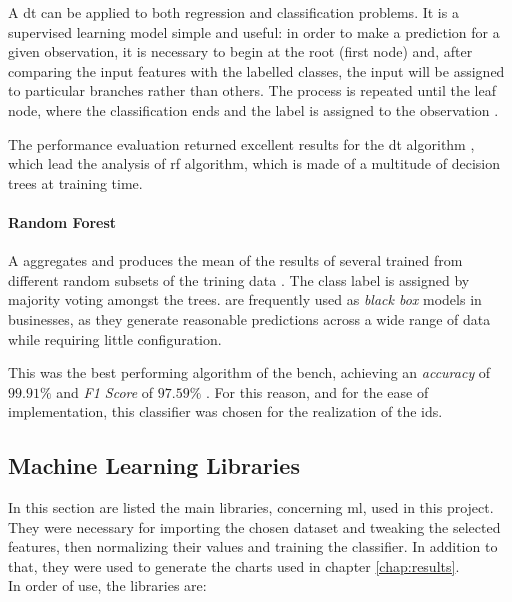 A \gls{dt} can be applied to both regression and classification problems. It is a supervised learning model simple and useful: in order to make a prediction for a given observation, it is necessary to begin at the root (first node) and, after comparing the input features with the labelled classes, the input will be assigned to particular branches rather than others. The process is repeated until the leaf node, where the classification ends and the label is assigned to the observation \cite[p. 307]{James2014}.
\par The performance evaluation returned excellent results for the \gls{dt} algorithm \cite{Mozley2020}, which lead the analysis of \gls{rf} algorithm, which is made of a multitude of decision trees at training time.

\paragraph{Random Forest}
\label{par:rf}

A  aggregates and produces the mean of the results of several  trained from different random subsets of the trining data \cite[p. 324]{James2014}. The class label is assigned by majority voting amongst the trees.  are frequently used as \textit{black box} models in businesses, as they generate reasonable predictions across a wide range of data while requiring little configuration.
\par This was the best performing algorithm of the bench, achieving an \textit{accuracy} of $99.91\%$ and \textit{F1 Score} of $97.59\%$ \cite{Mozley2020}. For this reason, and for the ease of implementation, this classifier was chosen for the realization of the \gls{ids}.


\subsection{Machine Learning Libraries}
\label{subsec:ml-libraries}

In this section are listed the main libraries, concerning \gls{ml}, used in this project. They were necessary for importing the chosen dataset and tweaking the selected features, then normalizing their values and training the classifier. In addition to that, they were used to generate the charts used in chapter \ref{chap:results}. \\ In order of use, the libraries are:

